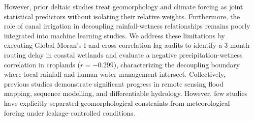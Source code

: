 However, prior deltaic studies treat geomorphology and climate forcing as joint statistical predictors without isolating their relative weights. Furthermore, the role of canal irrigation in decoupling rainfall-wetness relationships remains poorly integrated into machine learning studies. We address these limitations by executing Global Moran's I and cross-correlation lag audits to identify a 3-month routing delay in coastal wetlands and evaluate a negative precipitation-wetness correlation in croplands ($r = -0.299$), characterizing the decoupling boundary where local rainfall and human water management intersect.
Collectively, previous studies demonstrate significant progress in remote sensing flood mapping, sequence modelling, and differentiable hydrology. However, few studies have explicitly separated geomorphological constraints from meteorological forcing under leakage-controlled conditions.


